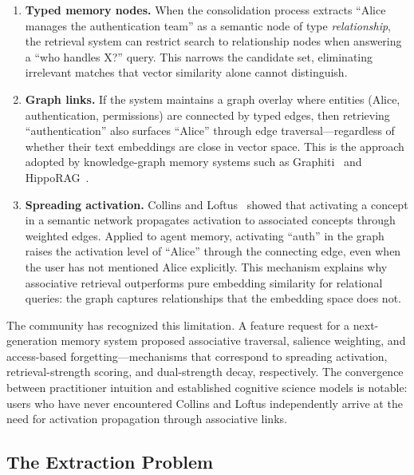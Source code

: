 \begin{enumerate}[leftmargin=*, nosep]
    \item \textbf{Typed memory nodes.}  When the consolidation process
    extracts ``Alice manages the authentication team'' as a semantic
    node of type \emph{relationship}, the retrieval system can restrict
    search to relationship nodes when answering a ``who handles X?''
    query.  This narrows the candidate set, eliminating irrelevant
    matches that vector similarity alone cannot distinguish.

    \item \textbf{Graph links.}  If the system maintains a graph
    overlay where entities (Alice, authentication, permissions) are
    connected by typed edges, then retrieving ``authentication'' also
    surfaces ``Alice'' through edge traversal---regardless of whether
    their text embeddings are close in vector space.  This is the
    approach adopted by knowledge-graph memory systems such as
    Graphiti~\cite{dempsey2025graphiti} and HippoRAG~\cite{gutierrez2024hipporag}.

    \item \textbf{Spreading activation.}  Collins and
    Loftus~\cite{collins1975} showed that activating a concept in a
    semantic network propagates activation to associated concepts through
    weighted edges.  Applied to agent memory, activating ``auth'' in the
    graph raises the activation level of ``Alice'' through the connecting
    edge, even when the user has not mentioned Alice explicitly.  This
    mechanism explains why associative retrieval outperforms pure
    embedding similarity for relational queries: the graph captures
    relationships that the embedding space does not.
\end{enumerate}

The community has recognized this limitation.  A feature request for
a next-generation memory system proposed associative traversal,
salience weighting, and access-based forgetting---mechanisms that
correspond to spreading activation, retrieval-strength scoring, and
dual-strength decay, respectively.  The convergence between practitioner
intuition and established cognitive science models is notable: users
who have never encountered Collins and Loftus independently arrive at
the need for activation propagation through associative links.

\subsection{The Extraction Problem}
\label{sec:memorymd-extraction}


